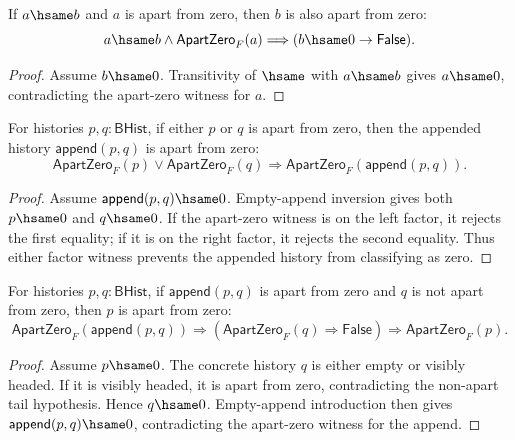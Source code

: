 \begin{theorem}
\label{thm:field-apartzero-empty-hsame-transport}
If $a\hsame b$ and $a$ is apart from zero, then $b$ is also apart from zero:
$$
a\hsame b\land \mathsf{ApartZero}_F(a)
\Longrightarrow
(b\hsame0\to\mathsf{False}).
$$
\end{theorem}
\begin{proof}
Assume $b\hsame0$. Transitivity of $\hsame$ with $a\hsame b$ gives
$a\hsame0$, contradicting the apart-zero witness for $a$.
\end{proof}

\begin{theorem}
\label{thm:field-apartzero-append-factor-closed}
For histories $p,q:\mathsf{BHist}$, if either $p$ or $q$ is apart from zero,
then the appended history $\mathsf{append}(p,q)$ is apart from zero:
$$
\mathsf{ApartZero}_F(p)\lor\mathsf{ApartZero}_F(q)
\Longrightarrow
\mathsf{ApartZero}_F(\mathsf{append}(p,q)).
$$
\end{theorem}
\begin{proof}
Assume $\mathsf{append}(p,q)\hsame0$. Empty-append inversion gives both
$p\hsame0$ and $q\hsame0$. If the apart-zero witness is on the left factor,
it rejects the first equality; if it is on the right factor, it rejects the
second equality. Thus either factor witness prevents the appended history
from classifying as zero.
\end{proof}

\begin{theorem}
\label{thm:field-apartzero-left-factor-of-tail-not-apart}
For histories $p,q:\mathsf{BHist}$, if $\mathsf{append}(p,q)$ is apart from
zero and $q$ is not apart from zero, then $p$ is apart from zero:
$$
\mathsf{ApartZero}_F(\mathsf{append}(p,q))
\Longrightarrow
(\mathsf{ApartZero}_F(q)\Rightarrow\mathsf{False})
\Longrightarrow
\mathsf{ApartZero}_F(p).
$$
\end{theorem}
\begin{proof}
Assume $p\hsame0$. The concrete history $q$ is either empty or visibly headed.
If it is visibly headed, it is apart from zero, contradicting the non-apart
tail hypothesis. Hence $q\hsame0$. Empty-append introduction then gives
$\mathsf{append}(p,q)\hsame0$, contradicting the apart-zero witness for the
append.
\end{proof}

